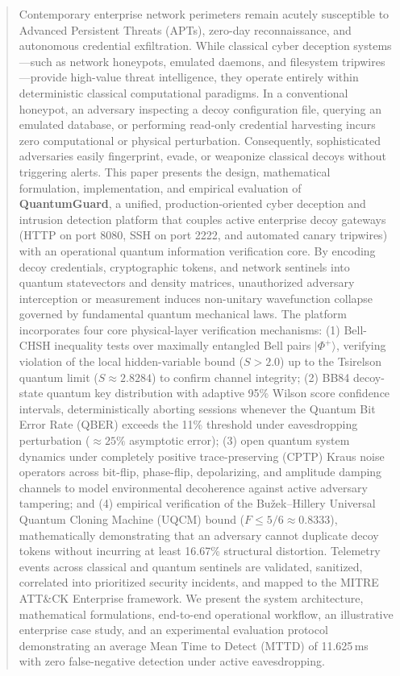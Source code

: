 \documentclass[journal,10pt]{IEEEtran}
\begin{document}
\begin{abstract}
Contemporary enterprise network perimeters remain acutely susceptible to Advanced Persistent Threats (APTs), zero-day reconnaissance, and autonomous credential exfiltration. While classical cyber deception systems---such as network honeypots, emulated daemons, and filesystem tripwires---provide high-value threat intelligence, they operate entirely within deterministic classical computational paradigms. In a conventional honeypot, an adversary inspecting a decoy configuration file, querying an emulated database, or performing read-only credential harvesting incurs zero computational or physical perturbation. Consequently, sophisticated adversaries easily fingerprint, evade, or weaponize classical decoys without triggering alerts. This paper presents the design, mathematical formulation, implementation, and empirical evaluation of \textbf{QuantumGuard}, a unified, production-oriented cyber deception and intrusion detection platform that couples active enterprise decoy gateways (HTTP on port 8080, SSH on port 2222, and automated canary tripwires) with an operational quantum information verification core. By encoding decoy credentials, cryptographic tokens, and network sentinels into quantum statevectors and density matrices, unauthorized adversary interception or measurement induces non-unitary wavefunction collapse governed by fundamental quantum mechanical laws. The platform incorporates four core physical-layer verification mechanisms: (1) Bell-CHSH inequality tests over maximally entangled Bell pairs $|\Phi^+\rangle$, verifying violation of the local hidden-variable bound ($S > 2.0$) up to the Tsirelson quantum limit ($S \approx 2.8284$) to confirm channel integrity; (2) BB84 decoy-state quantum key distribution with adaptive 95\% Wilson score confidence intervals, deterministically aborting sessions whenever the Quantum Bit Error Rate (QBER) exceeds the 11\% threshold under eavesdropping perturbation ($\approx 25\%$ asymptotic error); (3) open quantum system dynamics under completely positive trace-preserving (CPTP) Kraus noise operators across bit-flip, phase-flip, depolarizing, and amplitude damping channels to model environmental decoherence against active adversary tampering; and (4) empirical verification of the Bu\v{z}ek--Hillery Universal Quantum Cloning Machine (UQCM) bound ($F \le 5/6 \approx 0.8333$), mathematically demonstrating that an adversary cannot duplicate decoy tokens without incurring at least 16.67\% structural distortion. Telemetry events across classical and quantum sentinels are validated, sanitized, correlated into prioritized security incidents, and mapped to the MITRE ATT\&CK Enterprise framework. We present the system architecture, mathematical formulations, end-to-end operational workflow, an illustrative enterprise case study, and an experimental evaluation protocol demonstrating an average Mean Time to Detect (MTTD) of 11.625\,ms with zero false-negative detection under active eavesdropping.
\end{abstract}
\end{document}
